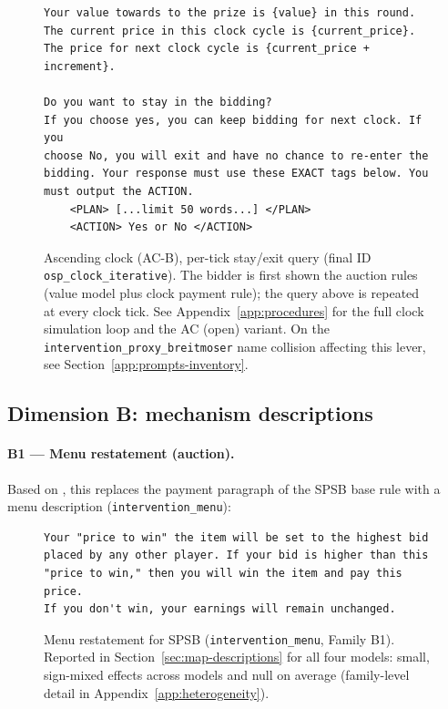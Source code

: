 \begin{figure}[H]
\begin{lstlisting}
Your value towards to the prize is {value} in this round.
The current price in this clock cycle is {current_price}.
The price for next clock cycle is {current_price + increment}.

Do you want to stay in the bidding?
If you choose yes, you can keep bidding for next clock. If you
choose No, you will exit and have no chance to re-enter the
bidding. Your response must use these EXACT tags below. You
must output the ACTION.
    <PLAN> [...limit 50 words...] </PLAN>
    <ACTION> Yes or No </ACTION>
\end{lstlisting}
\caption{Ascending clock (AC-B), per-tick stay/exit query (final ID \texttt{osp\_clock\_iterative}). The bidder is first shown the auction rules (value model plus clock payment rule); the query above is repeated at every clock tick. See Appendix~\ref{app:procedures} for the full clock simulation loop and the AC (open) variant. On the \texttt{intervention\_proxy\_breitmoser} name collision affecting this lever, see Section~\ref{app:prompts-inventory}.}
\label{fig:prompt-clock-iterative}
\end{figure}

\subsection{Dimension B: mechanism descriptions}\label{app:prompts-desc}

\paragraph{B1 --- Menu restatement (auction).} Based on \citet{gonczarowski2023strategyproofness}, this replaces the payment paragraph of the SPSB base rule with a menu description (\texttt{intervention\_menu}):

\begin{figure}[H]
\begin{lstlisting}
Your "price to win" the item will be set to the highest bid
placed by any other player. If your bid is higher than this
"price to win," then you will win the item and pay this price.
If you don't win, your earnings will remain unchanged.
\end{lstlisting}
\caption{Menu restatement for SPSB (\texttt{intervention\_menu}, Family B1). Reported in Section~\ref{sec:map-descriptions} for all four models: small, sign-mixed effects across models and null on average (family-level detail in Appendix~\ref{app:heterogeneity}).}
\label{fig:prompt-menu}
\end{figure}

